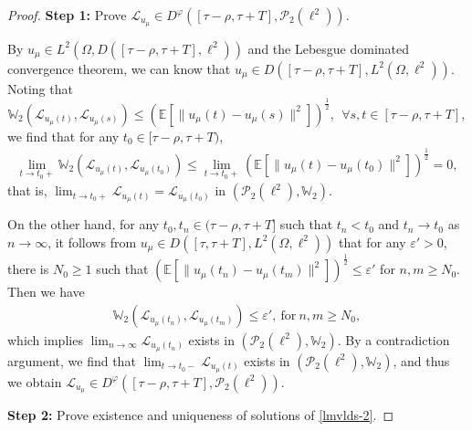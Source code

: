 \documentclass[11pt]{article}
\numberwithin{equation}{section}
\theoremstyle{plain}
\begin{document}
\begin{proof}
 {\bf Step 1:}  Prove
  $\mathcal{L}_{u_{\mu}} \in D^\varphi([\tau-\rho, \tau + T], \mathcal{P}_2(\ell^2))$.

 By $u_{\mu} \in  L^2(\Omega, D([\tau
 -\rho, \tau + T], \ell^2))$ and the Lebesgue dominated convergence theorem,
 we can know that $u_{\mu} \in D([\tau-\rho, \tau + T], L^2(\Omega,\ell^2) )$.
 Noting that
 $$\mathbb{W}_2(\mathcal{L}_{u_{\mu}(t)},
                       \mathcal{L}_{u_{\mu}(s)} )
    \le
    \left( \mathbb{E} \left[ \| u_{\mu}(t) - u_{\mu}(s) \|^2 \right]
    \right)^{\frac{1}{2}}, ~~ \forall s, t \in [\tau-\rho, \tau + T],$$
 we find that for any $t_0 \in [\tau-\rho, \tau + T)$,
 \begin{align*}
    \lim_{t \to t_0 +} \mathbb{W}_2(\mathcal{L}_{u_{\mu}(t)},
                       \mathcal{L}_{u_{\mu}(t_0 )} )
    \le \lim_{t \to t_0 +}
    \left( \mathbb{E} \left[ \| u_{\mu}(t) - u_{\mu}(t_0 ) \|^2 \right]
    \right)^{\frac{1}{2}}
    =0,
 \end{align*}
that is,
$ \lim_{t \to t_0 +} \mathcal{L}_{u_{\mu}(t)} = \mathcal{L}_{u_{\mu}(t_0)} $ in $\left( \mathcal{P}_2(\ell^2), \mathbb{W}_2 \right)$.

 On the other hand, for any $ t_0, t_n \in (\tau
 -\rho, \tau + T] $
 such that $t_n < t_0$ and $t_n \to t_0$ as $n \to \infty$,
 it follows from $u_{\mu} \in D([\tau,\tau + T], L^2(\Omega,\ell^2) )$ that
 for any $ \varepsilon' > 0 $, there is $ N_0 \ge 1 $ such that
 $\left( \mathbb{E} \left[ \| u_{\mu}(t_n) - u_{\mu}(t_m) \|^2 \right]
  \right)^{\frac{1}{2}}
  \le \varepsilon' $
 for $ n, m \ge N_0$.
 Then we have
 \begin{align*}
    \mathbb{W}_2(\mathcal{L}_{u_{\mu}(t_n)},
                       \mathcal{L}_{u_{\mu}(t_m)} )
     \le \varepsilon', \ \text{for}\ n,m \ge N_0,
 \end{align*}
 which implies $ \lim_{n \to \infty} \mathcal{L}_{u_{\mu}(t_n)} $ exists in $\left( \mathcal{P}_2(\ell^2), \mathbb{W}_2 \right) $.
 By a   contradiction argument,
 we  find  that
    $\lim_{t \to t_0 -} \mathcal{L}_{u_{\mu}(t)}$ exists in $\left( \mathcal{P}_2(\ell^2), \mathbb{W}_2 \right)$, and thus
    we obtain 
    $\mathcal{L}_{u_{\mu} } \in D^\varphi
    ([\tau
    -\rho, \tau + T], \mathcal{P}_2(\ell^2))$.

 {\bf Step 2:} Prove existence and uniqueness of solutions of \eqref{lmvlds-2}.


\end{proof}
\end{document}
